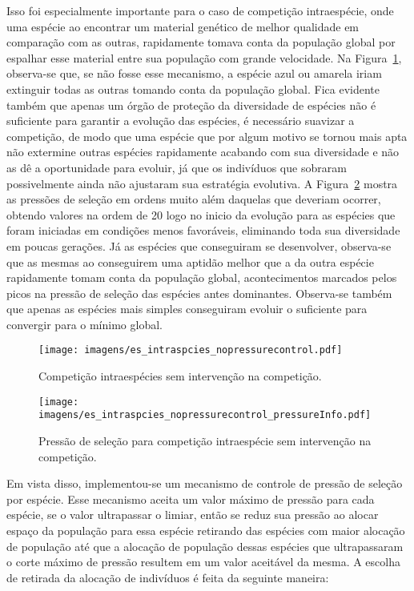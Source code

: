 Isso foi especialmente importante para o caso de competição
intraespécie, onde uma espécie ao encontrar um material genético de
melhor qualidade em comparação com as outras, rapidamente tomava conta
da população global por espalhar esse material entre sua população com
grande velocidade. Na Figura~\ref{fig:intraspecies_nopressure},
observa-se que, se não fosse esse mecanismo, a espécie azul ou amarela
iriam extinguir todas as outras tomando conta da população
global. Fica evidente também que apenas um órgão de proteção da
diversidade de espécies não é suficiente para garantir a evolução das
espécies, é necessário suavizar a competição, de modo que uma espécie
que por algum motivo se tornou mais apta não extermine outras espécies
rapidamente acabando com sua diversidade e não as dê a oportunidade
para evoluir, já que os indivíduos que sobraram possivelmente ainda não
ajustaram sua estratégia evolutiva. A
Figura~\ref{fig:intraspecies_nopressurecontrol_info} mostra as
pressões de seleção em ordens muito além daquelas que deveriam
ocorrer, obtendo valores na ordem de 20 logo no inicio da evolução
para as espécies que foram iniciadas em condições menos favoráveis,
eliminando toda sua diversidade em poucas gerações. Já as espécies que
conseguiram se desenvolver, observa-se que as mesmas ao conseguirem
uma aptidão melhor que a da outra espécie rapidamente tomam conta da
população global, acontecimentos marcados pelos picos na pressão de
seleção das espécies antes dominantes. Observa-se também que apenas as
espécies mais simples conseguiram evoluir o suficiente para convergir
para o mínimo global.

\begin{figure}[h!t]
\centering
\texttt{[image: imagens/es\_intraspcies\_nopressurecontrol.pdf]}
\caption[Competição intraespécies sem intervenção na
competição.]{Competição intraespécies sem intervenção na competição.}
\label{fig:intraspecies_nopressure}
\end{figure}

\begin{figure}[h!t]
\centering
\texttt{[image: imagens/es\_intraspcies\_nopressurecontrol\_pressureInfo.pdf]}
\caption[Pressão de seleção para competição intraespécie sem
intervenção na competição.]{Pressão de seleção para competição
intraespécie sem intervenção na competição.}
\label{fig:intraspecies_nopressurecontrol_info}
\end{figure}

Em vista disso, implementou-se um mecanismo de controle de pressão de
seleção por espécie. Esse mecanismo aceita um valor máximo de
pressão para cada espécie, se o valor ultrapassar o limiar, então se
reduz sua pressão ao alocar espaço da população para essa espécie
retirando das espécies com maior alocação de população até que a
alocação de população dessas espécies que ultrapassaram o corte máximo
de pressão resultem em um valor aceitável da mesma. A escolha de
retirada da alocação de indivíduos é feita da seguinte maneira:

